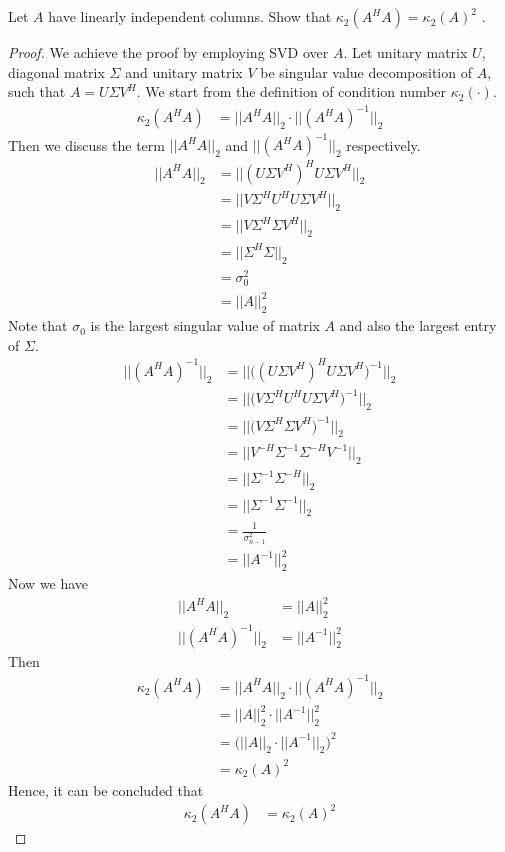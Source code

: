 \documentclass[11pt,a4paper]{article}
\begin{document}
\section{}
Let $A$ have linearly independent columns. Show that $\kappa_2 (A^H A) =
\kappa_2 (A)^2$ .
\begin{proof}
    We achieve the proof by employing SVD over $A$. Let unitary matrix $U$,
    diagonal matrix $\Sigma$ and unitary matrix $V$ be singular value
    decomposition of $A$, such that $A = U \Sigma V^H$. We start from the
    definition of condition number $\kappa_2 (\cdot)$. 
    \begin{align}
        \kappa_2 (A^H A) &= || A^H A ||_2 \cdot || (A^H A)^{-1} ||_2 
    \end{align}
    Then we discuss the term $|| A^H A ||_2$ and $|| (A^H A)^{-1} ||_2$ respectively.
    \begin{align}
        || A^H A ||_2 
        &=  || (U \Sigma V^H)^H U \Sigma V^H ||_2 \\
        &=  || V \Sigma^H U^H U \Sigma V^H ||_2 \\
        &=  || V \Sigma^H \Sigma V^H ||_2 \\
        &=  || \Sigma^H \Sigma ||_2 \\
        &=  \sigma^2_0 \\
        &= || A ||_2^2
    \end{align}
    Note that $\sigma_0$ is the largest singular value of matrix $A$ and also
    the largest entry of $\Sigma$.
 \begin{align}
     || (A^H A)^{-1} ||_2 
     &=  || \big( (U \Sigma V^H)^H U \Sigma V^H \big)^{-1} ||_2 \\
     &=  || \big( V \Sigma^H U^H U \Sigma V^H \big)^{-1} ||_2 \\
     &=  || \big( V \Sigma^H \Sigma V^H \big)^{-1} ||_2 \\
     &=  || V^{-H} \Sigma^{-1} \Sigma^{-H} V^{-1}  ||_2 \\
     &=  || \Sigma^{-1} \Sigma^{-H} ||_2 \\
     &=  || \Sigma^{-1} \Sigma^{-1} ||_2 \\
     &=  \frac{1}{\sigma_{n-1}^2} \\
     &= || A^{-1} ||_2^2
    \end{align}   
    Now we have 
    \begin{align}
        || A^H A ||_2 &= || A ||_2^2 \\
     || (A^H A)^{-1} ||_2 &= || A^{-1} ||_2^2
    \end{align}
    Then
    \begin{align}
        \kappa_2 (A^H A) &= || A^H A ||_2 \cdot || (A^H A)^{-1} ||_2  \\
        & = || A ||_2^2 \cdot || A^{-1} ||_2^2 \\
        & = \big( || A ||_2 \cdot || A^{-1} ||_2 \big)^2 \\
        & = \kappa_2(A)^2
    \end{align}
    Hence, it can be concluded that 
    \begin{align}
        \kappa_2 (A^H A) & = \kappa_2(A)^2
    \end{align}
\end{proof}
\end{document}
